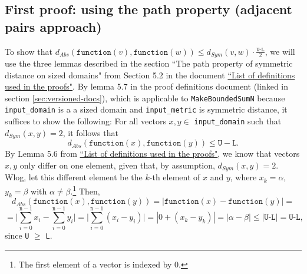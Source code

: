 \documentclass[11pt,a4paper]{article}
\theoremstyle{definition}
\newcommand{\dout}{\texttt{d\_out}}
\newcommand{\function}{\texttt{function}}
\newcommand{\silvia}[1]{{ {\color{blue}{(silvia)~#1}}}}
\begin{document}
\subsection{First proof: using the path property (adjacent pairs approach)}

To show that $d_{Abs}(\function(v), \function(w)) \leq d_{Sym}(v, w) \cdot \frac{\texttt{U-L}}{2}$, we will use the three lemmas described in the section ``The path property of symmetric distance on sized domains" from Section 5.2 in the document \href{https://www.overleaf.com/project/60d214e390b337703d200982}{``List of definitions used in the proofs"}. By lemma 5.7 in the proof definitions document (linked in section \ref{sec:versioned-docs}), which is applicable to \texttt{MakeBoundedSumN} because \texttt{input\_domain} is a a sized domain and \texttt{input\_metric} is symmetric distance, it suffices to show the following: For all vectors $x, y \in$ \texttt{input\_domain} such that $d_{Sym}(x, y) = 2$, it follows that 
\[
d_{Abs}(\texttt{function}(x), \texttt{function}(y)) \leq \texttt{U} - \texttt{L}.
\]
By Lemma 5.6 from \href{https://www.overleaf.com/project/60d214e390b337703d200982}{``List of definitions used in the proofs"}, we know that vectors $x, y$ only differ on one element, given that, by assumption, $d_{Sym}(x, y) = 2$. Wlog, let this different element be the $k$-th element of $x$ and $y$, where $x_k = \alpha$, $y_k = \beta$ with $\alpha \neq \beta$.\footnote{The first element of a vector is indexed by 0.} Then,
\[
    d_{Abs}(\texttt{function}(x), \texttt{function}(y)) = |\texttt{function}(x) - \texttt{function}(y)| = 
\]
\[
    = \Big|\sum_{i=0}^{\texttt{n}-1}x_i - \sum_{i=0}^{\texttt{n}-1}y_i\Big| = \Big| \sum_{i=0}^{\texttt{n}-1} (x_i - y_i) \Big| = |0 + (x_k - y_k)| = |\alpha - \beta| \leq |\texttt{U-L}| = \texttt{U-L},
\]
since \texttt{U} $\geq$ \texttt{L}.



\end{document}
